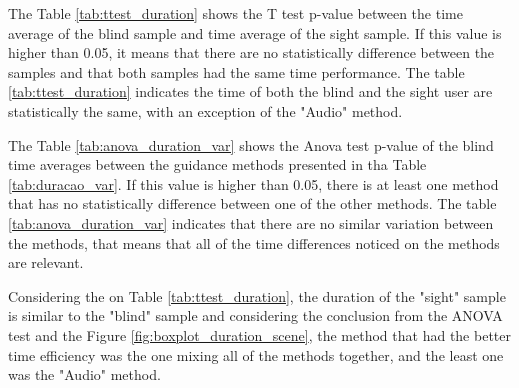 

The Table \ref{tab:ttest_duration} shows the T test p-value between the time average of the blind sample and time average of the sight sample. If this value is higher than 0.05, it means that there are no statistically difference between the samples and that both samples had the same time performance. The table \ref{tab:ttest_duration} indicates the time of both the blind and the sight user are statistically the same, with an exception of the "Audio" method.



The Table \ref{tab:anova_duration_var} shows the Anova test p-value of the blind time averages between the guidance methods presented in tha Table \ref{tab:duracao_var}. If this value is higher than 0.05, there is at least one method that has no statistically difference between one of the other methods. The table \ref{tab:anova_duration_var} indicates that there are no similar variation between the methods, that means that all of the time differences noticed on the methods are relevant.





%
%

Considering the on Table \ref{tab:ttest_duration}, the duration of the "sight" sample is similar to the "blind" sample and considering the conclusion from the ANOVA test and the Figure \ref{fig:boxplot_duration_scene}, the method that had the better time efficiency was the one mixing all of the methods together, and the least one was the "Audio" method.

